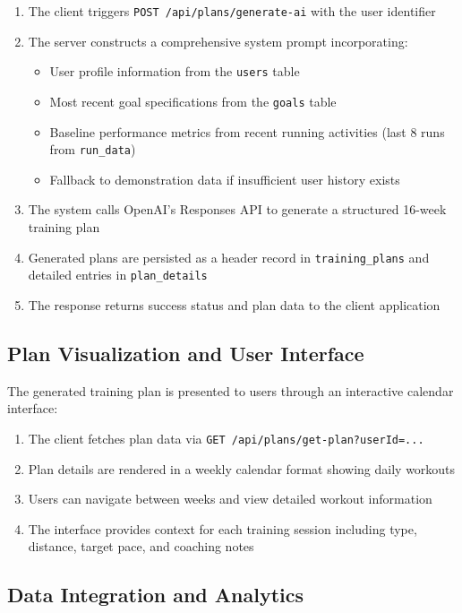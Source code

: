 \begin{enumerate}
    \item The client triggers \texttt{POST /api/plans/generate-ai} with the user identifier
    \item The server constructs a comprehensive system prompt incorporating:
    \begin{itemize}
        \item User profile information from the \texttt{users} table
        \item Most recent goal specifications from the \texttt{goals} table
        \item Baseline performance metrics from recent running activities (last 8 runs from \texttt{run\_data})
        \item Fallback to demonstration data if insufficient user history exists
    \end{itemize}
    \item The system calls OpenAI's Responses API to generate a structured 16-week training plan
    \item Generated plans are persisted as a header record in \texttt{training\_plans} and detailed entries in \texttt{plan\_details}
    \item The response returns success status and plan data to the client application
\end{enumerate}

\subsection{Plan Visualization and User Interface}

The generated training plan is presented to users through an interactive calendar interface:

\begin{enumerate}
    \item The client fetches plan data via \texttt{GET /api/plans/get-plan?userId=...}
    \item Plan details are rendered in a weekly calendar format showing daily workouts
    \item Users can navigate between weeks and view detailed workout information
    \item The interface provides context for each training session including type, distance, target pace, and coaching notes
\end{enumerate}

\subsection{Data Integration and Analytics}

